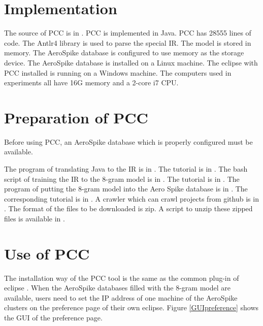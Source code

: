 \documentclass{sig-alternate-05-2015}
\begin{document}
\section{Implementation}

The source of PCC is in \cite{pccsource}. PCC is implemented in Java. PCC has 28555 lines of code. The Antlr4 \cite{antlr4} library is used to parse the special IR. The model is stored in memory. The AeroSpike database is configured to use memory as the storage device. The AeroSpike database is installed on a Linux machine. The eclipse with PCC installed is running on a Windows machine. The computers used in experiments all have 16G memory and a 2-core i7 CPU.

\section{Preparation of PCC}

Before using PCC, an AeroSpike database which is properly configured must be available.

The program of translating Java to the IR is in \cite{programprocessor}. The tutorial is in \cite{programprocessortutorial}. The bash script of training the IR to the 8-gram model is in \cite{ngramtrain}. The tutorial is in \cite{ngramtraintutorial}. The program of putting the 8-gram model into the Aero Spike database is in \cite{modeltoaero}. The corresponding tutorial is in \cite{modeltoaerotutorial}. A crawler which can crawl projects from github is in \cite{gitcrawler}. The format of the files to be downloaded is zip. A script to unzip these zipped files is available in \cite{unzipscript}.

\section{Use of PCC}

The installation way \cite{eclipseplugininstall} of the PCC tool is the same as the common plug-in \cite{eclipseplugins} of eclipse \cite{eclipseplatform}. When the AeroSpike databases filled with the 8-gram model are available, users need to set the IP address of one machine of the AeroSpike clusters on the preference page of their own eclipse. Figure \ref{GUIpreference} shows the GUI of the preference page.
\end{document}
